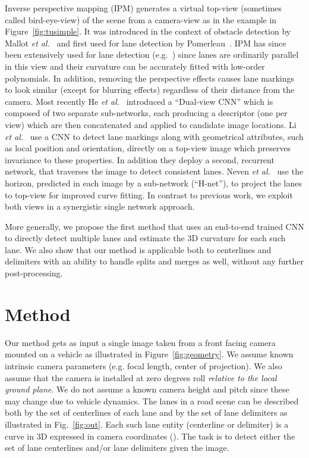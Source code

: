 \documentclass[10pt,twocolumn,letterpaper]{article}
\begin{document}
Inverse perspective mapping (IPM) generates a virtual top-view (sometimes called bird-eye-view) of the scene from a camera-view as in the example in Figure~\ref{fig:tusimple}. It was introduced in the context of obstacle detection by Mallot \textit{et al.}~\cite{Mallot} and first used for lane detection by Pomerleau~\cite{Pomerleau}. IPM has since been extensively used for lane detection (e.g.~\cite{Borkar,Aly}) since lanes are ordinarily parallel in this view and their curvature can be accurately fitted with low-order polynomials. In addition, removing the perspective effects causes lane markings to look similar (except for blurring effects) regardless of their distance from the camera. Most recently He \textit{et al.}~\cite{He} introduced a ``Dual-view CNN'' which is composed of two separate sub-networks, each producing a descriptor (one per view) which are then concatenated and applied to candidate image locations. Li \textit{et al.}~\cite{Li} use a CNN to detect lane markings along with geometrical attributes, such as local position and orientation, directly on a top-view image which preserves invariance to these properties. In addition they deploy a second, recurrent network, that traverses the image to detect consistent lanes. Neven \textit{et al.}~\cite{neven} use the horizon, predicted in each image by a sub-network (``H-net''), to project the lanes to top-view for improved curve fitting. In contrast to previous work, we exploit both views in a synergistic single network approach.

More generally, we propose the first method that uses an end-to-end trained CNN to directly detect multiple lanes and estimate the 3D curvature for each such lane. We also show that our method is applicable both to centerlines and delimiters with an ability to handle splits and merges as well, without any further post-processing. 

\section{Method}



Our method gets as input a single image taken from a front facing camera mounted on a vehicle as illustrated in Figure~\ref{fig:geometry}. We assume known intrinsic camera parameters  (e.g. focal length, center of projection). We also assume that the camera is installed at zero degrees roll \textit{relative to the local ground plane}. We do not assume a known camera height and pitch since these may change due to vehicle dynamics. The lanes in a road scene can be described both by the set of centerlines  of each lane and by the set of lane delimiters  as illustrated in Fig.~\ref{fig:out}. Each such lane entity (centerline or delimiter) is a curve in 3D expressed in camera coordinates ().  The task is to detect either the set of lane centerlines and/or lane delimiters given the image.
\end{document}
